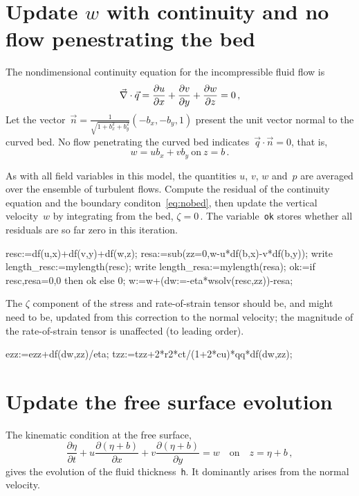 \documentclass[12pt,a5paper]{article}
\newcommand{\zs}{\zeta}
\begin{document}
\section{Update $w$ with continuity and no flow penestrating the bed}


The nondimensional continuity equation for the incompressible fluid flow is
\begin{equation}
    \divv\vec q=\D xu+\D yv+\D zw=0\,,
\end{equation}
Let the vector~$\vec n=\frac{1}{\sqrt{1+b_x^2+b_y^2}}(-b_x,-b_y,1)$ present the unit vector normal to the curved bed. No flow penetrating the curved bed indicates~$\vec q\cdot\vec n=0$, that is,
\begin{equation}
w=ub_x+vb_y\ \text{on}\ z=b\,.
\label{eq:nobed}
\end{equation}

As with all field variables in this model, the quantities $u$, $v$, $w$ and~$p$ are averaged over the ensemble of turbulent flows. Compute the residual of the continuity equation and the boundary conditon~\eqref{eq:nobed}, then update the
vertical velocity~$w$ by integrating from the bed, $\zs=0$\,.  The variable~\verb|ok| stores whether all residuals are so far zero in this iteration.

\begin{reduce}
resc:=df(u,x)+df(v,y)+df(w,z);
resa:=sub(zz=0,w-u*df(b,x)-v*df(b,y));
write length_resc:=mylength(resc);
write length_resa:=mylength(resa);
ok:=if {resc,resa}={0,0} then ok else 0;
w:=w+(dw:=-eta*wsolv(resc,zz))-resa;
\end{reduce}

The $\zs$ component of the stress and rate-of-strain tensor should be, and might need to be, updated from this correction to the normal velocity;  the magnitude of the rate-of-strain tensor is unaffected (to leading order). 

\begin{reduce}
ezz:=ezz+df(dw,zz)/eta;
tzz:=tzz+2*r2*ct/(1+2*cu)*qq*df(dw,zz);
\end{reduce}





\section{Update the free surface evolution}

The kinematic condition at the free surface, 
\begin{equation}
    \frac{\partial\eta}{\partial t}+u\frac{\partial(\eta+b)}{\partial x}+v\frac{\partial(\eta+b)}{\partial y}=w\quad\text{on}\quad z=\eta+b\,,
\end{equation}
gives the evolution of the fluid thickness~\verb|h|.  It dominantly arises from the normal velocity.
\end{document}
